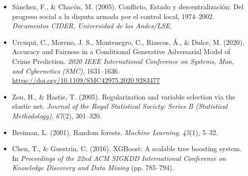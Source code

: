 \documentclass[12pt]{article}
\begin{document}
\begin{itemize}
    \item Sánchez, F., \& Chacón, M. (2005). Conflicto, Estado y descentralización: Del progreso social a la disputa armada por el control local, 1974–2002. \textit{Documentos CIDER, Universidad de los Andes/LSE}.
    
    \item Urcuqui, C., Moreno, J. S., Montenegro, C., Riascos, Á., \& Dulce, M. (2020). Accuracy and Fairness in a Conditional Generative Adversarial Model of Crime Prediction. \textit{2020 IEEE International Conference on Systems, Man, and Cybernetics (SMC)}, 1631--1636. \url{https://doi.org/10.1109/SMC42975.2020.9283477}
    
    \item Zou, H., \& Hastie, T. (2005). Regularization and variable selection via the elastic net. \textit{Journal of the Royal Statistical Society: Series B (Statistical Methodology)}, \textit{67}(2), 301--320.
    
    \item Breiman, L. (2001). Random forests. \textit{Machine Learning}, \textit{45}(1), 5--32.
    
    \item Chen, T., \& Guestrin, C. (2016). XGBoost: A scalable tree boosting system. In \textit{Proceedings of the 22nd ACM SIGKDD International Conference on Knowledge Discovery and Data Mining} (pp. 785--794).
\end{itemize}
\end{document}
